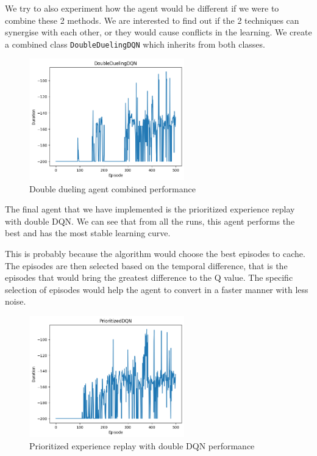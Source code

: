\documentclass{article}
\newcommand{\code}[1]{\lstinline|#1|}
\begin{document}
We try to also experiment how the agent would be different if we were to combine 
these 2 methods. We are interested to find out if the 2 techniques can
synergise with each other, or they would cause conflicts in the learning. We create
a combined class \code{DoubleDuelingDQN} which inherits from both classes.

\begin{figure}[h]
    \centering
    \includegraphics[width=0.6\textwidth]{double_dueling.png}
    \caption{Double dueling agent combined performance}
\end{figure}

\newpage

The final agent that we have implemented is the prioritized experience replay with
double DQN. We can see that from all the runs, this agent performs the best
and has the most stable learning curve.

This is probably because the algorithm would choose the best episodes to cache.
The episodes are then selected based on the temporal difference, that is the episodes
that would bring the greatest difference to the Q value.
The specific selection of episodes would help the agent to convert in a
faster manner with less noise.

\begin{figure}[h]
    \centering
    \includegraphics[width=0.6\textwidth]{prioritised_experience.png}
    \caption{Prioritized experience replay with double DQN performance}
\end{figure}
\end{document}
